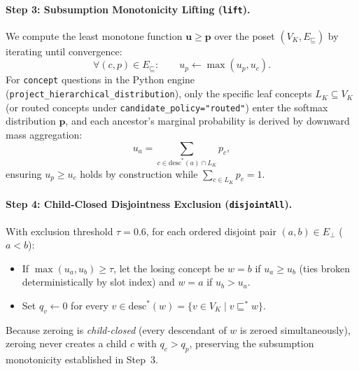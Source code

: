 \documentclass[11pt,a4paper]{article}
\begin{document}
\paragraph{Step 3: Subsumption Monotonicity Lifting (\texttt{lift}).}
We compute the least monotone function $\mathbf{u} \ge \mathbf{p}$ over the poset $(V_K, E_{\sqsubseteq})$ by iterating until convergence:
\begin{equation}
  \forall (c, p) \in E_{\sqsubseteq}: \qquad u_p \leftarrow \max(u_p, u_c).
\end{equation}
For \texttt{concept} questions in the Python engine (\texttt{project\_hierarchical\_distribution}), only the specific leaf concepts $L_K \subseteq V_K$ (or routed concepts under \texttt{candidate\_policy="routed"}) enter the softmax distribution $\mathbf{p}$, and each ancestor's marginal probability is derived by downward mass aggregation:
\begin{equation}
  u_a = \sum_{c \in \mathrm{desc}^*(a) \cap L_K} p_c,
\end{equation}
ensuring $u_p \ge u_c$ holds by construction while $\sum_{c \in L_K} p_c = 1$.

\paragraph{Step 4: Child-Closed Disjointness Exclusion (\texttt{disjointAll}).}
With exclusion threshold $\tau = 0.6$, for each ordered disjoint pair $(a, b) \in E_{\perp}$ ($a < b$):
\begin{itemize}[leftmargin=1.8em,itemsep=0.2em]
  \item If $\max(u_a, u_b) \ge \tau$, let the losing concept be $w = b$ if $u_a \ge u_b$ (ties broken deterministically by slot index) and $w = a$ if $u_b > u_a$.
  \item Set $q_v \leftarrow 0$ for every $v \in \mathrm{desc}^*(w) = \{v \in V_K \mid v \sqsubseteq^* w\}$.
\end{itemize}
Because zeroing is \emph{child-closed} (every descendant of $w$ is zeroed simultaneously), zeroing never creates a child $c$ with $q_c > q_p$, preserving the subsumption monotonicity established in Step~3.
\end{document}
